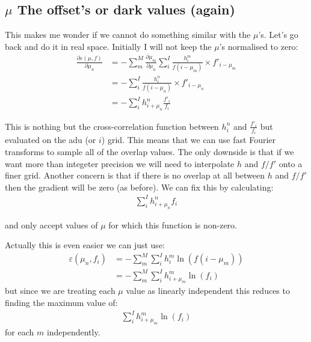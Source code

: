 \documentclass[11pt]{article}
\begin{document}
\subsection{$\mu$ The offset's or dark values (again)}
This makes me wonder if we cannot do something similar with the $\mu$'s. Let's go back and do it in real space. Initially I will not keep the $\mu$'s normalised to zero:
\begin{align}
   \frac{\partial \varepsilon(\mu, f)}{\partial \mu_n} &=-\sum_m^M  \frac{\partial \mu_m}{\partial \mu_n} \sum_i^I \frac{h^m_i}{f(i - \mu_m)} \times f'_{i-\mu_m} \\
   &=-\sum_i^I \frac{h^n_i}{f(i - \mu_n)} \times f'_{i-\mu_n} \\
   &=-\sum_i^I h^n_{i+\mu_n} \frac{f'_i}{f_i}       
   \label{mu_grad_real}
\end{align}

This is nothing but the cross-correlation function between $h^n_{i}$ and $\frac{f'_i}{f_i}$ but evaluated on the adu (or $i$) grid. This means that we can use fast Fourier transforms to sample all of the overlap values. The only downside is that if we want more than integeter precision we will need to interpolate $h$ and $f/f'$ onto a finer grid. Another concern is that if there is no overlap at all between $h$ and $f/f'$ then the gradient will be zero (as before). We can fix this by calculating:
\begin{align}
   \sum_i^I h^n_{i+\mu_n} f_i
\end{align}

and only accept values of $\mu$ for which this function is non-zero.

Actually this is even easier we can just use:
\begin{align}
   \varepsilon(\mu_n, f_i) &= -\sum_m^M \sum_i^I h^m_i \ln(f(i - \mu_m))\\
                           &= -\sum_m^M \sum_i^I h^m_{i + \mu_m} \ln(f_i)
\end{align}
but since we are treating each $\mu$ value as linearly independent this reduces to finding the maximum value of:
\begin{align}
    \sum_i^I h^m_{i + \mu_m} \ln(f_i)
\end{align}
for each $m$ independently. 
\end{document}

